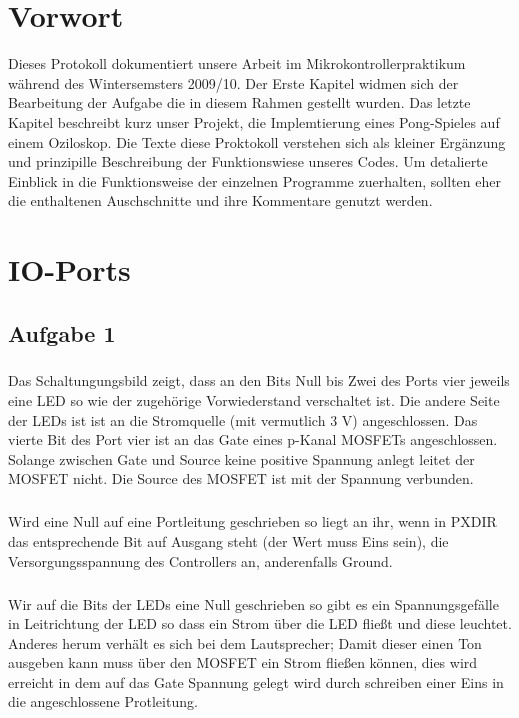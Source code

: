 \chapter{Vorwort}

Dieses Protokoll dokumentiert unsere Arbeit im Mikrokontrollerpraktikum während des Wintersemsters 2009/10. Der Erste Kapitel widmen sich der Bearbeitung der Aufgabe die in diesem Rahmen gestellt wurden. Das letzte Kapitel beschreibt kurz unser Projekt, die Implemtierung eines Pong-Spieles auf einem Oziloskop. Die Texte diese Proktokoll verstehen sich als kleiner Ergänzung und prinzipille Beschreibung der Funktionswiese unseres Codes. Um detalierte Einblick in die Funktionsweise der einzelnen Programme zuerhalten, sollten eher die enthaltenen Auschschnitte und ihre Kommentare genutzt werden.

\chapter{IO-Ports}

\section*{Aufgabe 1}

\paragraph*{}
Das Schaltungungsbild zeigt, dass an den Bits Null bis Zwei des Ports vier 
jeweils eine LED so wie der zugehörige Vorwiederstand verschaltet ist. 
Die andere Seite der LEDs ist ist an die Stromquelle (mit vermutlich 3 V) 
angeschlossen. Das vierte Bit des Port vier ist an das Gate eines p-Kanal 
MOSFETs angeschlossen. Solange zwischen Gate und Source keine positive
Spannung anlegt leitet der MOSFET nicht. Die Source des MOSFET ist mit 
der Spannung verbunden.
\paragraph*{}
Wird eine Null auf eine Portleitung geschrieben so liegt an ihr, wenn in
PXDIR das entsprechende Bit auf Ausgang steht (der Wert muss Eins sein), 
die Versorgungsspannung des Controllers an, anderenfalls Ground.
\paragraph*{}
Wir auf die Bits der LEDs eine Null geschrieben so gibt es ein 
Spannungsgefälle in Leitrichtung der LED so dass ein Strom über die LED 
fließt und diese leuchtet. Anderes herum verhält es sich bei dem 
Lautsprecher; Damit dieser einen Ton ausgeben kann muss über den MOSFET
ein Strom fließen können, dies wird erreicht in dem auf das Gate Spannung 
gelegt wird durch schreiben einer Eins in die angeschlossene Protleitung.

